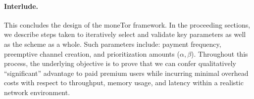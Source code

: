 
\paragraph*{Interlude.} This concludes the design of the moneTor framework. In
the proceeding sections, we describe steps taken to iteratively select and
validate key parameters as well as the scheme as a whole. Such parameters
include: payment frequency, preemptive channel creation, and prioritization
amounts ($\alpha, \beta$). Throughout this process, the underlying objective is to
prove that we can confer qualitatively ``significant'' advantage to paid premium
users while incurring minimal overhead costs with respect to throughput, memory
usage, and latency within a realistic network environment.


